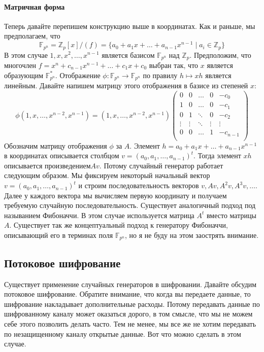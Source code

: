 \paragraph{Матричная форма}

Теперь давайте перепишем конструкцию выше в координатах.
Как и раньше, мы предполагаем, что
\[
\mathbb F_{p^n} = \mathbb Z_p[x]/(f)= \{a_0 + a_1 x + \ldots + a_{n-1}x^{n-1}\mid a_i\in \mathbb Z_p\}
\]
В этом случае $1, x, x^2,\ldots,x^{n-1}$ является базисом $\mathbb F_{p^n}$ над $\mathbb Z_p$.
Предположим, что многочлен $f = x^n + c_{n-1}x^{n-1} +\ldots + c_1 x + c_0$ выбран так, что $x$ является образующим $\mathbb F_{p^n}^*$.
Отображение $\phi \colon \mathbb F_{p^n}\to \mathbb F_{p^n}$ по правилу $h \mapsto xh$ является линейным.
Давайте напишем матрицу этого отображения в базисе из степеней $x$:
\[
\phi(1, x,\ldots, x^{n-2}, x^{n-1}) = (1, x,\ldots, x^{n-2}, x^{n-1})
\begin{pmatrix}
{0}&{0}&{\ldots}&{0}&{-c_0}\\
{1}&{0}&{\ldots}&{0}&{-c_1}\\
{0}&{1}&{\ddots}&{0}&{-c_2}\\
{\vdots}&{\vdots}&{\ddots}&{\vdots}&{\vdots}\\
{0}&{0}&{\ldots}&{1}&{-c_{n-1}}\\
\end{pmatrix}
\]
Обозначим матрицу отображения $\phi$ за $A$.
Элемент $h= a_0 + a_1 x + \ldots + a_{n-1}x^{n-1}$ в координатах описывается столбцом $v = (a_0,a_1,\ldots,a_{n-1})^t$.
Тогда элемент $xh$ описывается произведением$Av$.
Потому случайный генератор работает следующим образом.
Мы фиксируем некоторый начальный вектор $v = (a_0,a_1,\ldots,a_{n-1})^t$ и строим последовательность векторов $v, Av, A^2v, A^3v, \ldots$.
Далее у каждого вектора мы вычисляем первую координату и получаем требуемую случайную последовательность.
Существует аналогичный подход под называнием Фибоначчи.
В этом случае используется матрица $A^t$ вместо матрицы $A$.
Существует так же концептуальный подход к генератору Фибоначчи, описывающий его в терминах поля $\mathbb F_{p^n}$, но я не буду на этом заострять внимание.

\subsection{Потоковое шифрование}

Существует применение случайных генераторов в шифровании.
Давайте обсудим потоковое шифрование.
Обратите внимание, что когда вы передаете данные, то шифрование накладывает дополнительные расходы.
Потому передавать данные по шифрованному каналу может оказаться дорого, в том смысле, что мы не можем себе этого позволить делать часто.
Тем не менее, мы все же не хотим передавать по незащищенному каналу открытые данные.
Вот что можно сделать в этом случае.


